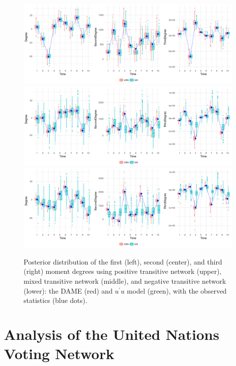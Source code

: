 \documentclass[a4paper]{article}
\begin{document}
\begin{figure}
	\centering
			\includegraphics[width=1\textwidth]{plots_paper/newpositiveD-1.png}	
		\includegraphics[width=1\textwidth]{plots_paper/newmixedD-1.png}	
						\includegraphics[width=1\textwidth]{plots_paper/newnegativeD-1.png}	
	\caption {Posterior distribution of the first (left), second (center), and third (right) moment degrees using positive transitive network (upper), mixed transitive network (middle), and negative transitive network (lower): the DAME (red) and $u^\prime u$ model (green), with the observed statistics (blue dots).}
	\label{figure:negativitystudy}
\end{figure}

\section{Analysis of the United Nations Voting Network}\label{sec: UNvoting}
\end{document}
